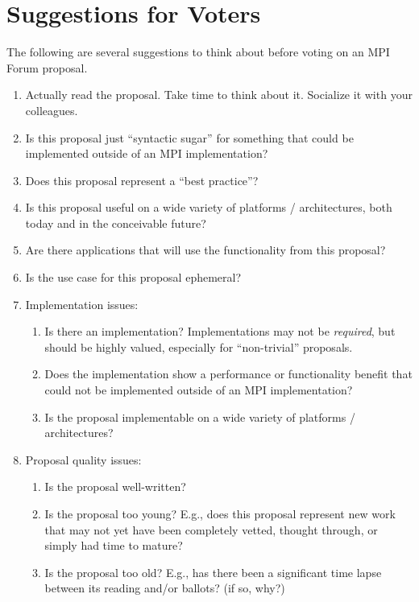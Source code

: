 \chapter{Suggestions for Voters}

\vspace{-10pt}

The following are several suggestions to think about before voting on
an MPI Forum proposal.  

\begin{enumerate}
\item Actually read the proposal.  Take time to think about it.
  Socialize it with your colleagues.

\item Is this proposal just ``syntactic sugar'' for something that
  could be implemented outside of an MPI implementation?

\item Does this proposal represent a ``best practice''?

\item Is this proposal useful on a wide variety of platforms /
  architectures, both today and in the conceivable future?

\item Are there applications that will use the functionality from this
  proposal?

\item Is the use case for this proposal ephemeral?

\item Implementation issues:
  \begin{enumerate}
  \item Is there an implementation?  Implementations may not be
    {\em required}, but should be highly valued, especially for
    ``non-trivial'' proposals.
    
  \item Does the implementation show a performance or functionality
    benefit that could not be implemented outside of an MPI
    implementation?
    
  \item Is the proposal implementable on a wide variety of platforms /
    architectures?
  \end{enumerate}

\item Proposal quality issues:
  \begin{enumerate}
  \item Is the proposal well-written?
    
  \item Is the proposal too young?  E.g., does this proposal represent
    new work that may not yet have been completely vetted, thought
    through, or simply had time to mature?
    
  \item Is the proposal too old?  E.g., has there been a significant
    time lapse between its reading and/or ballots?  (if so, why?)
  \end{enumerate}

\end{enumerate}
